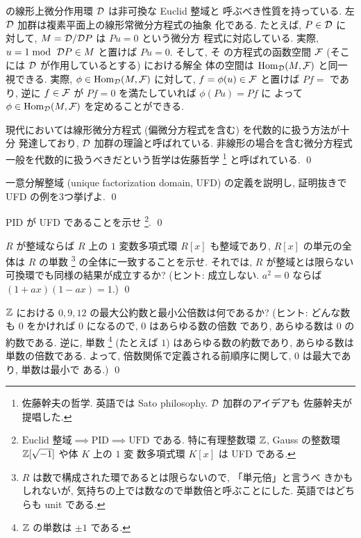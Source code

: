 \documentclass[12pt,twoside]{jarticle}
\begin{document}
\begin{guide}
   の線形上微分作用環 ${\mathcal D}$ は非可換な Euclid 整域と
  呼ぶべき性質を持っている. 左 ${\mathcal D}$ 加群は複素平面上の線形常微分方程式の抽象
  化である. たとえば, $P\in{\mathcal D}$ に対して, $M={\mathcal D}/{\mathcal D} P$ は $Pu=0$ という微分方
  程式に対応している. 実際, $u=1\bmod~{\mathcal D} P\in M$ と置けば $Pu=0$. そして, そ
  の方程式の函数空間 ${\mathcal F}$ (そこには ${\mathcal D}$ が作用しているとする) における解全
  体の空間は $\mathop{\mathrm{Hom}}\nolimits_{\mathcal D}(M,{\mathcal F})$ と同一視できる. 実際, $\phi\in\mathop{\mathrm{Hom}}\nolimits_{\mathcal D}(M,{\mathcal F})$ 
  に対して, $f=\phi(u)\in {\mathcal F}$ と置けば $Pf=$ であり, 
  逆に $f\in{\mathcal F}$ が $Pf=0$ を満たしていれば $\phi(Pu)=Pf$ に
  よって $\phi\in\mathop{\mathrm{Hom}}\nolimits_{\mathcal D}(M,{\mathcal F})$ を定めることができる. 

  現代においては線形微分方程式 (偏微分方程式を含む) を代数的に扱う方法が十分
  発達しており, ${\mathcal D}$ 加群の理論と呼ばれている. 非線形の場合を含む微分方程式
  一般を代数的に扱うべきだという哲学は佐藤哲学%
  \footnote{佐藤幹夫の哲学. 英語では Sato philosophy. ${\mathcal D}$ 加群のアイデアも
    佐藤幹夫が提唱した.}%
  と呼ばれている.
  \qed
\end{guide}

\begin{question}[一意分解整域の定義]
  一意分解整域 (unique factorization domain, UFD) の定義を説明し, 証明抜きで
  UFD の例を3つ挙げよ.  \qed
\end{question}

\begin{question}\label{q:PID-is-UFD}
  PID が UFD であることを示せ%
  \footnote{$\text{Euclid 整域}\implies\text{PID}\implies\text{UFD}$ である.
    特に有理整数環 ${\mathbb Z}$, Gauss の整数環 ${\mathbb Z}[\sqrt{-1}]$ や体 $K$ 上の $1$ 変
    数多項式環 $K[x]$ は UFD である.}. 
  \qed 
\end{question}

\begin{question}
  $R$ が整域ならば $R$ 上の $1$ 変数多項式環 $R[x]$ も整域であり,
  $R[x]$ の単元の全体は $R$ の単数%
  \footnote{$R$ は数で構成された環であるとは限らないので, 「単元倍」と言うべ
    きかもしれないが, 気持ちの上では数なので単数倍と呼ぶことにした.
    英語ではどちらも unit である.} %
  の全体に一致することを示せ.
  それでは, $R$ が整域とは限らない可換環でも同様の結果が成立するか?
  (ヒント: 成立しない. $a^2=0$ ならば $(1+ax)(1-ax)=1$.) \qed
\end{question}

\begin{question}[$0$ を含む最大公約数と最小公倍数]
  ${\mathbb Z}$ における ${0,9,12}$ の最大公約数と最小公倍数は何であるか? 
  (ヒント: どんな数も $0$ をかければ $0$ になるので, $0$ はあらゆる数の倍数
  であり, あらゆる数は $0$ の約数である. 
  逆に, 単数%
  \footnote{${\mathbb Z}$ の単数は $\pm1$ である.} %
  (たとえば $1$) はあらゆる数の約数であり, あらゆる数は単数の倍数である.
  よって, 倍数関係で定義される前順序に関して, $0$ は最大であり, 単数は最小で
  ある.)
  \qed
\end{question}
\end{document}
